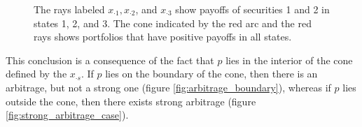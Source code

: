 \documentclass[\topdir/lecture\_notes.tex]{subfiles}
\begin{document}
\begin{figure}
    \begin{center}
    \end{center}
    \caption{The rays labeled \(x_{\cdot 1}, x_{\cdot 2}\), and \(x_{\cdot 3}\) show payoffs of securities 1 and 2 in states 1, 2, and 3. The cone indicated by the red arc and the red rays shows portfolios that have positive payoffs in all states.}
    \label{fig:positive_payoff_cone}
\end{figure}

 
This conclusion is a consequence of the fact that \(p\) lies in the interior of the cone defined by the \(x_{\cdot s}\). If \(p\) lies on the boundary of the cone, then there is an arbitrage, but not a strong one (figure \ref{fig:arbitrage_boundary}), whereas if \(p\) lies outside the cone, then there exists strong arbitrage (figure \ref{fig:strong_arbitrage_case}).
\end{document}
